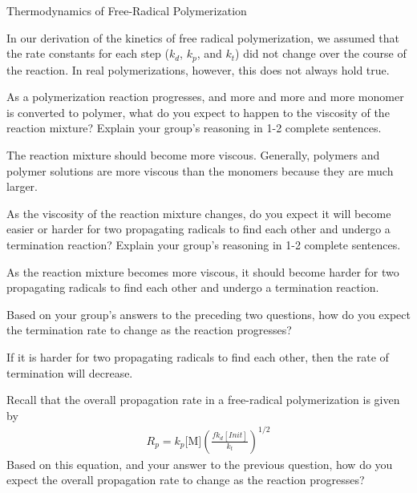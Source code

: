\begin{activity}{Thermodynamics of Free-Radical Polymerization}
\begin{ctqs}
\begin{enumerate}
		\end{enumerate}

\end{ctqs}



\begin{model}
\label{\labelbase:mdl:rxnrates}

	In our derivation of the kinetics of free radical polymerization, we assumed that the rate constants for each step ($k_d$, $k_p$, and $k_t$) did not change over the course of the reaction.  In real polymerizations, however, this does not always hold true.

\end{model}

\begin{ctqs}

	\question As a polymerization reaction progresses, and more and more and more monomer is converted to polymer, what do you expect to happen to the viscosity of the reaction mixture?  Explain your group's reasoning in 1-2 complete sentences.
	
		\begin{solution}[1.5in]
			The reaction mixture should become more viscous.  Generally, polymers and polymer solutions are more viscous than the monomers because they are much larger.		
		\end{solution}
		
	\question As the viscosity of the reaction mixture changes, do you expect it will become easier or harder for two propagating radicals to find each other and undergo a termination reaction?  Explain your group's reasoning in 1-2 complete sentences.
	
		\begin{solution}[1.5in]
			As the reaction mixture becomes more viscous, it should become harder for two propagating radicals to find each other and undergo a termination reaction.
		\end{solution}
	
	\question Based on your group's answers to the preceding two questions, how do you expect the termination rate to change as the reaction progresses?
	
		\begin{solution}[1in]
			If it is harder for two propagating radicals to find each other, then the rate of termination will decrease.
		\end{solution}
	
	\question Recall that the overall propagation rate in a free-radical polymerization is given by
					\begin{align*}
						R_p = k_p\text{[M]}\left(\frac{fk_d[Init]}{k_t}\right)^{1/2}
					\end{align*}
		Based on this equation, and your answer to the previous question, how do you expect the overall propagation rate to change as the reaction progresses?
	

\end{ctqs}
\end{activity}
